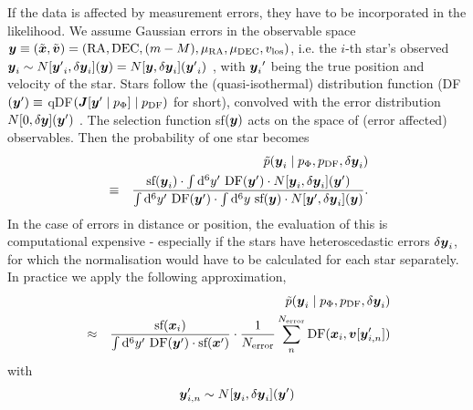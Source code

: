 
If the data is affected by measurement errors, they have to be incorporated in the likelihood. We assume Gaussian errors in the observable space $\boldsymbol{y} \equiv (\tilde{\boldsymbol{x}},\tilde{\boldsymbol{v}})=(\text{RA},\text{DEC},(m-M),\mu_\text{RA},\mu_\text{DEC},v_\text{los})$, i.e. the $i$-th star's observed $\boldsymbol{y}_i \sim N[{\boldsymbol{y}'}_i,\delta \boldsymbol{y}_i](\boldsymbol{y}) = N[\boldsymbol{y},\delta \boldsymbol{y}_i]({\boldsymbol{y}'}_i)$ , with ${\boldsymbol{y}_i}'$ being the true position and velocity of the star. Stars follow the (quasi-isothermal) distribution function (DF$(\boldsymbol{y}') \equiv$ qDF$(\boldsymbol{J}[\boldsymbol{y}' \mid p_\Phi] \mid p_\text{DF})$ for short), convolved with the error distribution $N[0,\delta \boldsymbol{y}](\boldsymbol{y}')$ . The selection function sf$(\boldsymbol{y})$ acts on the space of (error affected) observables. 
Then the probability of one star becomes
\begin{eqnarray*}
&&\tilde{p}(\boldsymbol{y}_i \mid p_\Phi,p_\text{DF},\delta \boldsymbol{y}_i)\\
& \equiv& \frac{\text{sf}(\boldsymbol{y}_i) \cdot \int \mathop{}\!\mathrm{d^6} y' \  \text{DF}(\boldsymbol{y}') \cdot N[\boldsymbol{y}_i,\delta \boldsymbol{y}_i](\boldsymbol{y}')}{\int \mathop{}\!\mathrm{d^6}y'  \  \text{DF}(\boldsymbol{y}')  \cdot  \int \mathop{}\!\mathrm{d^6} y \  \text{sf}(\boldsymbol{y})  \cdot N[\boldsymbol{y}',\delta \boldsymbol{y}_i](\boldsymbol{y})}.
\end{eqnarray*}
In the case of errors in distance or position, the evaluation of this is computational expensive - especially if the stars have heteroscedastic errors $\delta \boldsymbol{y}_i$, for which the normalisation would have to be calculated for each star separately. In practice we apply the following approximation,
\begin{eqnarray}
&&\tilde{p}(\boldsymbol{y}_i \mid p_\Phi,p_\text{DF},\delta \boldsymbol{y}_i) \nonumber\\
&\approx& \frac{ \text{sf}(\boldsymbol{x}_i)}{\int \mathop{}\!\mathrm{d^6}y'  \  \text{DF}(\boldsymbol{y}')  \cdot   \text{sf}(\boldsymbol{x}')} \cdot \frac{1}{N_\text{error}} \sum_n^{N_\text{error}}  \text{DF}(\boldsymbol{x}_i,\boldsymbol{v}[\boldsymbol{y}'_{i,n}]) \label{eq:errorconv}
\end{eqnarray}
with
\begin{eqnarray}
\boldsymbol{y}'_{i,n} \sim N[\boldsymbol{y}_i,\delta \boldsymbol{y}_i](\boldsymbol{y}')\nonumber
\end{eqnarray}
